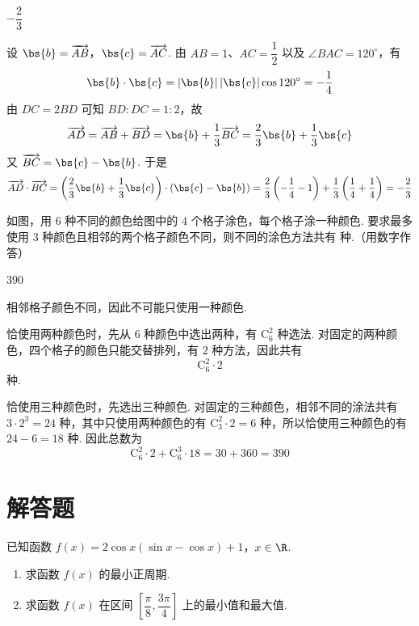 \begin{answer}
\(-\dfrac{2}{3}\)
\end{answer}

\begin{solution}
设 \(\bs{b}=\overrightarrow{AB}\)，\(\bs{c}=\overrightarrow{AC}\). 由 \(AB=1\)、\(AC=\dfrac12\) 以及 \(\angle BAC=120^{\circ}\)，有
\[
\bs{b}\cdot\bs{c}=|\bs{b}|\,|\bs{c}|\cos120^{\circ}=-\frac14
\]
由 \(DC=2BD\) 可知 \(BD:DC=1:2\)，故
\[
\overrightarrow{AD}=\overrightarrow{AB}+\overrightarrow{BD}
=\bs{b}+\frac13\overrightarrow{BC}
=\frac23\bs{b}+\frac13\bs{c}
\]
又 \(\overrightarrow{BC}=\bs{c}-\bs{b}\).
于是
\[
\overrightarrow{AD}\cdot\overrightarrow{BC}=\left(\frac23\bs{b}+\frac13\bs{c}\right)\cdot(\bs{c}-\bs{b})=\frac23\left(-\frac14-1\right)+\frac13\left(\frac14+\frac14\right)=-\frac23
\]
\end{solution}

\begin{problem}
如图，用 \(6\) 种不同的颜色给图中的 \(4\) 个格子涂色，每个格子涂一种颜色. 要求最多使用 \(3\) 种颜色且相邻的两个格子颜色不同，则不同的涂色方法共有\fillinblank{} 种.（用数字作答）

\end{problem}

\begin{answer}
\(390\)
\end{answer}

\begin{solution}
相邻格子颜色不同，因此不可能只使用一种颜色.

恰使用两种颜色时，先从 \(6\) 种颜色中选出两种，有 \(\mathrm C_6^2\) 种选法. 对固定的两种颜色，四个格子的颜色只能交替排列，有 \(2\) 种方法，因此共有
\[
\mathrm C_6^2\cdot2
\]
种.

恰使用三种颜色时，先选出三种颜色. 对固定的三种颜色，相邻不同的涂法共有 \(3\cdot2^3=24\) 种，其中只使用两种颜色的有 \(\mathrm C_3^2\cdot2=6\) 种，所以恰使用三种颜色的有 \(24-6=18\) 种. 因此总数为
\[
\mathrm C_6^2\cdot2+\mathrm C_6^3\cdot18=30+360=390
\]
\end{solution}

\section{解答题}

\begin{problem}
已知函数 \(f(x) = 2\cos x (\sin x - \cos x) + 1\)，\(x \in \R\).

\begin{enumerate}
\item 求函数 \(f(x)\) 的最小正周期.
\item 求函数 \(f(x)\) 在区间 \(\left[\dfrac{\pi}{8}, \dfrac{3\pi}{4}\right]\) 上的最小值和最大值.
\end{enumerate}
\end{problem}

